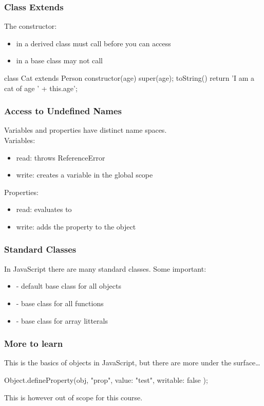 \begin{frame}[fragile] \frametitle{Class Extends}
The constructor:
\begin{itemize}
  \item in a derived class must call  before you can access 
  \item in a base class may not call 
\end{itemize}
\begin{CodeBox}{}
class Cat extends Person {
  constructor(age) {
    super(age);
  }
  toString() {
    return 'I am a cat of age ' + this.age';
  }
}
\end{CodeBox}
\end{frame}

\begin{frame}[fragile] \frametitle{Access to Undefined Names}
Variables and properties have distinct name spaces.
\\ \vspace{4mm}
Variables:
\begin{itemize}
  \item read: throws ReferenceError
  \item write: creates a variable in the global scope
\end{itemize}
\vspace{5mm}
Properties:
\begin{itemize}
  \item read: evaluates to 
  \item write: adds the property to the object
\end{itemize}
\end{frame}

\begin{frame}[fragile] \frametitle{Standard Classes}
In JavaScript there are many standard classes. Some important: 
\begin{itemize}
  \item {} - default base class for all objects
  \item {} - base class for all functions
  \item {} - base class for array litterals
\end{itemize}
\end{frame}

\begin{frame}[fragile] \frametitle{More to learn}

This is the basics of objects in JavaScript, but there are more under the surface\ldots
\vspace{8mm}
\begin{CodeBox}{}
Object.defineProperty(obj, "prop", {
    value: "test",
    writable: false
});
\end{CodeBox}
\vspace{8mm}
This is however out of scope for this course.
\end{frame}


